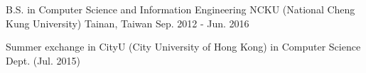 

\begin{cventries}

  \cventry
    {B.S. in Computer Science and Information Engineering} %
    {NCKU (National Cheng Kung University)} %
    {Tainan, Taiwan} %
    {Sep. 2012 - Jun. 2016} %
    {
      \begin{cvitems} %
        \item {Summer exchange in CityU (City University of Hong Kong) in Computer Science Dept. (Jul. 2015)}
      \end{cvitems}
    }

\end{cventries}
